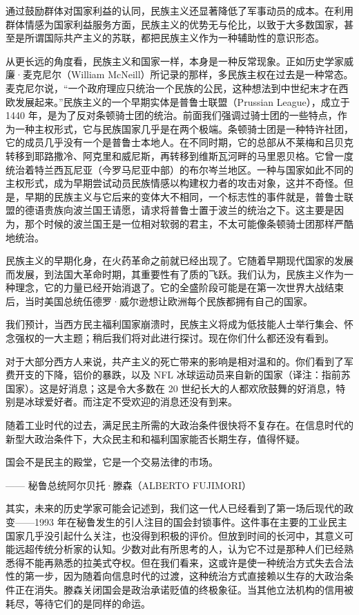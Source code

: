 通过鼓励群体对国家利益的认同，民族主义还显著降低了军事动员的成本。在利用群体情感为国家利益服务方面，民族主义的优势无与伦比，以致于大多数国家，甚至是所谓国际共产主义的苏联，都把民族主义作为一种辅助性的意识形态。

从更长远的角度看，民族主义和国家一样，本身是一种反常现象。正如历史学家威廉·麦克尼尔（William McNeill）所记录的那样，多民族主权在过去是一种常态。麦克尼尔说，“一个政府理应只统治一个民族的公民，这种想法到中世纪末才在西欧发展起来。”民族主义的一个早期实体是普鲁士联盟（Prussian League），成立于 1440 年，是为了反对条顿骑士团的统治。前面我们强调过骑士团的一些特点，作为一种主权形式，它与民族国家几乎是在两个极端。条顿骑士团是一种特许社团，它的成员几乎没有一个是普鲁士本地人。在不同时期，它的总部从不莱梅和吕贝克转移到耶路撒冷、阿克里和威尼斯，再转移到维斯瓦河畔的马里恩贝格。它曾一度统治着特兰西瓦尼亚（今罗马尼亚中部）的布尔岑兰地区。一种与国家如此不同的主权形式，成为早期尝试动员民族情感以构建权力者的攻击对象，这并不奇怪。但是，早期的民族主义与它后来的变体大不相同，一个标志性的事件就是，普鲁士联盟的德语贵族向波兰国王请愿，请求将普鲁士置于波兰的统治之下。这主要是因为，那个时候的波兰国王是一位相对软弱的君主，不太可能像条顿骑士团那样严酷地统治。

民族主义的早期化身，在火药革命之前就已经出现了。它随着早期现代国家的发展而发展，到法国大革命时期，其重要性有了质的飞跃。我们认为，民族主义作为一种理念，它的力量已经开始消退了。它的全盛阶段可能是在第一次世界大战结束后，当时美国总统伍德罗·威尔逊想让欧洲每个民族都拥有自己的国家。

我们预计，当西方民主福利国家崩溃时，民族主义将成为低技能人士举行集会、怀念强权的一大主题；稍后我们将对此进行探讨。现在你们什么都还没有看到。

对于大部分西方人来说，共产主义的死亡带来的影响是相对温和的。你们看到了军费开支的下降，铝价的暴跌，以及 NFL 冰球运动员来自新的国家（译注：指前苏国家）。这是好消息；这是令大多数在 20 世纪长大的人都欢欣鼓舞的好消息，特别是冰球爱好者。而注定不受欢迎的消息还没有到来。

随着工业时代的过去，满足民主所需的大政治条件很快将不复存在。在信息时代的新型大政治条件下，大众民主和和福利国家能否长期生存，值得怀疑。

\begin{tcolorbox}
国会不是民主的殿堂，它是一个交易法律的市场。
\begin{flushright}
—— 秘鲁总统阿尔贝托·滕森（ALBERTO FUJIMORI）
\end{flushright}
\end{tcolorbox}

其实，未来的历史学家可能会记述到，我们这一代人已经看到了第一场后现代的政变——1993 年在秘鲁发生的引人注目的国会封锁事件。这件事在主要的工业民主国家几乎没引起什么关注，也没得到积极的评价。但放到时间的长河中，其意义可能远超传统分析家的认知。少数对此有所思考的人，认为它不过是那种人们已经熟悉得不能再熟悉的拉美式夺权。但在我们看来，这或许是使一种统治方式失去合法性的第一步，因为随着向信息时代的过渡，这种统治方式直接赖以生存的大政治条件正在消失。滕森关闭国会是政治承诺贬值的终极象征。当其他立法机构的信用被耗尽，等待它们的是同样的命运。

